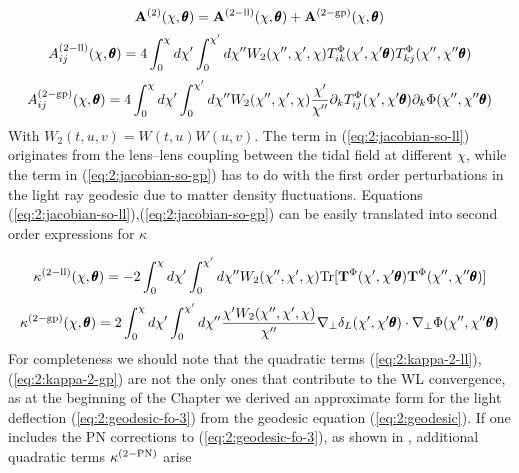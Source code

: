 \begin{equation}
\label{eq:2:jacobian-so}
\mathbf{A}^{(2)}(\chi,\pmb{\theta}) = \mathbf{A}^{(2-{\rm ll})}(\chi,\pmb{\theta}) + \mathbf{A}^{(2-{\rm gp})}(\chi,\pmb{\theta}) 
\end{equation}
%
\begin{equation}
\label{eq:2:jacobian-so-ll}
A_{ij}^{(2-{\rm ll})}(\chi,\pmb{\theta}) = 4\int_0^\chi d\chi'\int_0^{\chi'}d\chi'' W_2(\chi'',\chi',\chi)T^{\Phi}_{ik}(\chi',\chi'\pmb{\theta})T^{\Phi}_{kj}(\chi'',\chi''\pmb{\theta})
\end{equation} 
%
\begin{equation}
\label{eq:2:jacobian-so-gp}
A_{ij}^{(2-{\rm gp})}(\chi,\pmb{\theta}) = 4\int_0^\chi d\chi'\int_0^{\chi'}d\chi'' W_2(\chi'',\chi',\chi)\frac{\chi'}{\chi''}\partial_kT^{\Phi}_{ij}(\chi',\chi'\pmb{\theta})\partial_k\Phi(\chi'',\chi''\pmb{\theta})
\end{equation} 
%
With $W_2(t,u,v)=W(t,u)W(u,v)$. The term in (\ref{eq:2:jacobian-so-ll}) originates from the lens--lens coupling between the tidal field at different $\chi$, while the term in (\ref{eq:2:jacobian-so-gp}) has to do with the first order perturbations in the light ray geodesic due to matter density fluctuations. Equations (\ref{eq:2:jacobian-so-ll}),(\ref{eq:2:jacobian-so-gp}) can be easily translated into second order expressions for $\kappa$

\begin{equation}
\label{eq:2:kappa-2-ll}
\kappa^{(2-{\rm ll})}(\chi,\pmb{\theta}) = -2\int_0^\chi d\chi'\int_0^{\chi'}d\chi'' W_2(\chi'',\chi',\chi){\rm Tr} [\mathbf{T}^{\Phi}(\chi',\chi'\pmb{\theta})\mathbf{T}^{\Phi}(\chi'',\chi''\pmb{\theta})]
\end{equation} 
%
\begin{equation}
\label{eq:2:kappa-2-gp}
\kappa^{(2-{\rm gp})}(\chi,\pmb{\theta}) = 2\int_0^\chi d\chi'\int_0^{\chi'}d\chi'' \frac{\chi'W_2(\chi'',\chi',\chi)}{\chi''}\nabla_\perp \delta_L(\chi',\chi'\pmb{\theta})\cdot\nabla_\perp\Phi(\chi'',\chi''\pmb{\theta})
\end{equation} 
%
For completeness we should note that the quadratic terms (\ref{eq:2:kappa-2-ll}),(\ref{eq:2:kappa-2-gp}) are not the only ones that contribute to the WL convergence, as at the beginning of the Chapter we derived an approximate form for the light deflection (\ref{eq:2:geodesic-fo-3}) from the geodesic equation (\ref{eq:2:geodesic}). If one includes the PN corrections to (\ref{eq:2:geodesic-fo-3}), as shown in \citep{PNLensing}, additional quadratic terms $\kappa^{(2-{\rm PN})}$ arise

